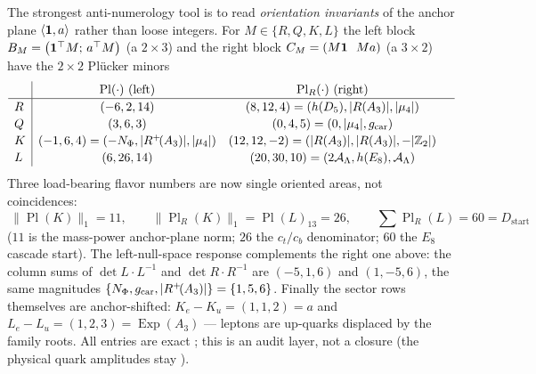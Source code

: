 \begin{winbox}
The strongest anti-numerology tool is to read \emph{orientation invariants} of the anchor plane
$\langle\mathbf 1,a\rangle$ rather than loose integers. For $M\in\{R,Q,K,L\}$ the left block
$B_M=\bigl(\mathbf 1^\top M;\,a^\top M\bigr)$ (a $2{\times}3$) and the right block $C_M=(M\onev\ \ Ma)$ (a
$3{\times}2$) have the $2{\times}2$ Plücker minors
\[
  \renewcommand{\arraystretch}{1.15}
  \begin{array}{l|ccc}
   & \operatorname{Pl}(\cdot)\ \text{(left)} & \operatorname{Pl}_R(\cdot)\ \text{(right)} & \\\hline
  R & (-6,2,14) & (8,12,4)=(h(D_5),|R(A_3)|,|\mu_4|) & \\
  Q & (3,6,3) & (0,4,5)=(0,|\mu_4|,\gcar) & \\
  K & (-1,6,4)=(-N_\Phi,|R^+\!(A_3)|,|\mu_4|) & (12,12,-2)=(|R(A_3)|,|R(A_3)|,-|\Z_2|) & \\
  L & (6,26,14) & (20,30,10)=(2\AL,h(E_8),\AL) & \\
  \end{array}
\]
Three load-bearing flavor numbers are now single oriented areas, not coincidences:
\[
  \boxed{\ \|\operatorname{Pl}(K)\|_1=11,\qquad
  \|\operatorname{Pl}_R(K)\|_1=\operatorname{Pl}(L)_{13}=26,\qquad
  \sum\operatorname{Pl}_R(L)=60=D_{\mathrm{start}}\ }
\]
($11$ is the mass-power anchor-plane norm; $26$ the $c_t/c_b$ denominator; $60$ the $E_8$ cascade start).
The left-null-space response complements the right one above: the column sums of $\det L\cdot L^{-1}$ and
$\det R\cdot R^{-1}$ are $(-5,1,6)$ and $(1,-5,6)$, the same magnitudes
$\{N_\Phi,g_{\mathrm{car}},|R^+\!(A_3)|\}=\{1,5,6\}$. Finally the sector rows themselves are anchor-shifted:
$K_e{-}K_u=(1,1,2)=a$ and $L_e{-}L_u=(1,2,3)=\operatorname{Exp}(A_3)$ --- leptons are up-quarks displaced by
the family roots. All entries are exact \mE; this is an audit layer, not a closure (the physical quark
amplitudes stay \mC). 
\end{winbox}

